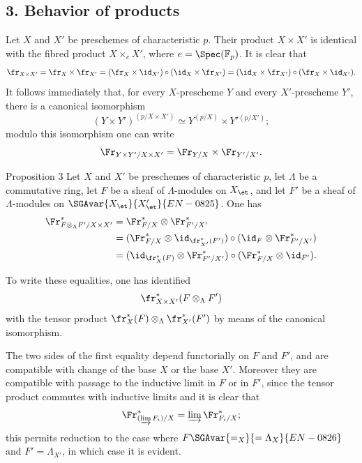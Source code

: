\subsection*{3. Behavior of products}

Let $X$ and $X'$ be preschemes of characteristic $p$. Their product $X\times X'$ is identical with the fibred product $X\times_eX'$, where $e=\Spec(\mathbb F_p)$. It is clear that
\[
\fr_{X\times X'}=\fr_X\times\fr_{X'}=(\fr_X\times\id_{X'})\circ(\id_X\times\fr_{X'})
=(\id_X\times\fr_{X'})\circ(\fr_X\times\id_{X'}).
\]
It follows immediately that, for every $X$-prescheme $Y$ and every $X'$-prescheme $Y'$, there is a canonical isomorphism
\[
(Y\times Y')^{(p/X\times X')}
\simeq Y^{(p/X)}\times Y'{}^{(p/X')};
\]
modulo this isomorphism one can write
\[
\Fr_{Y\times Y'/X\times X'}=\Fr_{Y/X}\times\Fr_{Y'/X'}.
\]

\begin{statement}{Proposition 3}
Let $X$ and $X'$ be preschemes of characteristic $p$, let $\Lambda$ be a commutative ring, let $F$ be a sheaf of $\Lambda$-modules on $X_{\et}$, and let $F'$ be a sheaf of $\Lambda$-modules on $\SGAvar{X_{\et}}{X'_{\et}}{EN-0825}$. One has
\[
\begin{aligned}
\Fr^*_{F\otimes_\Lambda F'/X\times X'}
&=\Fr^*_{F/X}\otimes\Fr^*_{F'/X'}\\
&=(\Fr^*_{F/X}\otimes\id_{\fr_{X'}^*(F')})
  \circ(\id_F\otimes\Fr^*_{F'/X'})\\
&=(\id_{\fr_X^*(F)}\otimes\Fr^*_{F'/X'})
  \circ(\Fr^*_{F/X}\otimes\id_{F'}).
\end{aligned}
\]
\end{statement}

To write these equalities, one has identified
\[
\fr_{X\times X'}^*(F\otimes_\Lambda F')
\]
with the tensor product $\fr_X^*(F)\otimes_\Lambda\fr_{X'}^*(F')$ by means of the canonical isomorphism.

The two sides of the first equality depend functorially on $F$ and $F'$, and are compatible with change of the base $X$ or the base $X'$. Moreover they are compatible with passage to the inductive limit in $F$ or in $F'$, since the tensor product commutes with inductive limits and it is clear that
\[
\Fr^*_{(\varinjlim F_i)/X}=\varinjlim\Fr^*_{F_i/X};
\]
this permits reduction to the case where $F\SGAvar{=_X}{=\Lambda_X}{EN-0826}$ and $F'=\Lambda_{X'}$, in which case it is evident.


